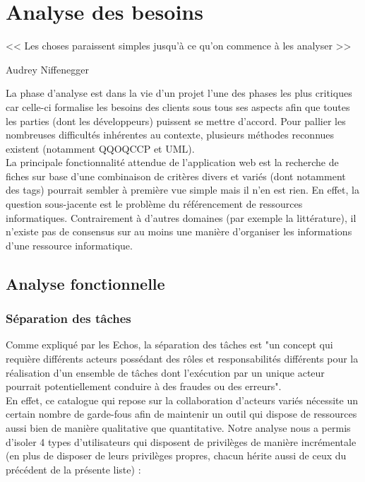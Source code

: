 
\chapter{Analyse des besoins}

\epigraph{<< Les choses paraissent simples jusqu'à ce qu'on commence à les analyser >>}{Audrey Niffenegger}

La phase d'analyse est dans la vie d'un projet l'une des phases les plus critiques car celle-ci formalise les besoins des clients sous tous ses aspects afin que toutes les parties (dont les développeurs) puissent se mettre d'accord. Pour pallier les nombreuses difficultés inhérentes au contexte, plusieurs méthodes reconnues existent (notamment \Gls{QQOQCCP} et UML). \\

La principale fonctionnalité attendue de l'application web est la recherche de \glspl{fiche} sur base d'une combinaison de critères divers et variés (dont notamment des \glspl{tag}) pourrait sembler à première vue simple mais il n'en est rien. En effet, la question sous-jacente est le problème du référencement de ressources informatiques. Contrairement à d'autres domaines (par exemple la littérature), il n'existe pas de consensus sur au moins une manière d'organiser les informations d'une ressource informatique.

\section{Analyse fonctionnelle}

\subsection*{Séparation des tâches}

Comme expliqué par les Echos\cite{SOD}, la séparation des tâches est "un concept qui requière différents acteurs possédant des rôles et responsabilités différents pour la réalisation d’un ensemble de tâches dont l’exécution par un unique acteur pourrait potentiellement conduire à des fraudes ou des erreurs". \\


En effet, ce catalogue qui repose sur la collaboration d'acteurs variés nécessite un certain nombre de garde-fous afin de maintenir un outil qui dispose de ressources aussi bien de manière qualitative que quantitative. Notre analyse nous a permis d'isoler 4 types d'utilisateurs qui disposent de privilèges de manière incrémentale (en plus de disposer de leurs privilèges propres, chacun hérite aussi de ceux du précédent de la présente liste) :


